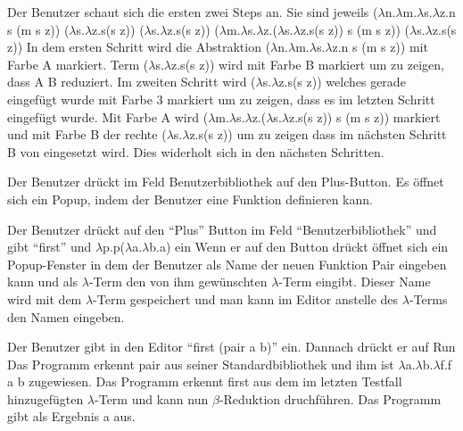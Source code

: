 \documentclass[parskip=full,11pt,twoside]{scrartcl}
\begin{document}
{Der Benutzer schaut sich die ersten zwei Steps an. Sie sind jeweils
 \newline ($\lambda$n.$\lambda$m.$\lambda$s.$\lambda$z.n s (m s z)) ($\lambda$s.$\lambda$z.s(s z)) ($\lambda$s.$\lambda$z.s(s z))
 \newline ($\lambda$m.$\lambda$s.$\lambda$z.($\lambda$s.$\lambda$z.s(s z)) s (m s z)) ($\lambda$s.$\lambda$z.s(s z))
}
{In dem ersten Schritt wird die Abstraktion ($\lambda$n.$\lambda$m.$\lambda$s.$\lambda$z.n s (m s z)) mit Farbe A markiert. Term  ($\lambda$s.$\lambda$z.s(s z)) wird mit Farbe B markiert um zu zeigen, dass A B reduziert. Im zweiten Schritt wird  ($\lambda$s.$\lambda$z.s(s z)) welches gerade eingefügt wurde mit Farbe 3 markiert um zu zeigen, dass es im letzten Schritt eingefügt wurde. Mit Farbe A wird ($\lambda$m.$\lambda$s.$\lambda$z.($\lambda$s.$\lambda$z.s(s z)) s (m s z)) markiert und mit Farbe B der rechte ($\lambda$s.$\lambda$z.s(s z)) um zu zeigen dass im nächsten Schritt B von eingesetzt wird. Dies widerholt sich in den nächsten Schritten. }



{Der Benutzer drückt im Feld Benutzerbibliothek auf den Plus-Button.}
{Es öffnet sich ein Popup, indem der Benutzer eine Funktion definieren kann.}

{Der Benutzer drückt auf den \enquote{Plus} Button im Feld \enquote{Benutzerbibliothek} und gibt \enquote {first} und $\lambda$p.p($\lambda$a.$\lambda$b.a) ein}
{Wenn er auf den Button drückt öffnet sich ein Popup-Fenster in dem der Benutzer als Name der neuen Funktion Pair eingeben kann und als $\lambda$-Term den von ihm gewünschten $\lambda$-Term eingibt. Dieser Name wird mit dem $\lambda$-Term gespeichert und man kann im Editor anstelle des $\lambda$-Terms den Namen eingeben.}

{ Der Benutzer gibt in den Editor \enquote {first (pair a b)} ein. Dannach drückt er auf Run}
{ Das Programm erkennt pair aus seiner Standardbibliothek und ihm ist $\lambda$a.$\lambda$b.$\lambda$f.f a b  zugewiesen. Das Programm erkennt first aus dem im letzten Testfall hinzugefügten $\lambda$-Term und kann nun $\beta$-Reduktion druchführen. Das Programm gibt als Ergebnis a aus.}
\end{document}
